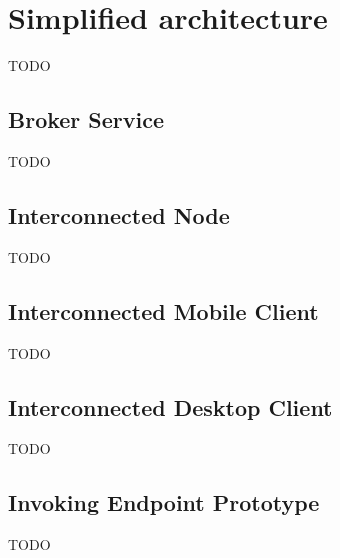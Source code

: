 \section{Simplified architecture}
TODO

\subsection{Broker Service}
TODO

\subsection{Interconnected Node}
TODO

\subsection{Interconnected Mobile Client}
TODO

\subsection{Interconnected Desktop Client}
TODO

\subsection{Invoking Endpoint Prototype}
TODO
